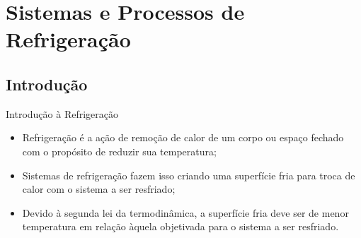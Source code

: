 \section{Sistemas e Processos de Refrigeração}

\subsection{Introdução}

    \begin{frame}{Introdução à Refrigeração}\vspace*{-2em}
        \begin{itemize}
            \item<1-> \alert{Refrigeração} é a ação de \alert{remoção de calor} de um
                \alert{corpo} ou \alert{espaço fechado} com o propósito de \alert{reduzir sua
                temperatura};
                \\[\bigskipamount]
            \item<2-> \alert{Sistemas de refrigeração} fazem isso criando uma \alert{superfície
                fria} para troca de calor com o sistema a ser resfriado;
                \\[\bigskipamount]
            \item<3-> Devido à \alert{segunda lei da termodinâmica}, a superfície fria deve ser
                de \alert{menor temperatura} em relação àquela objetivada para o sistema a ser
                resfriado.
        \end{itemize}
    \end{frame}
